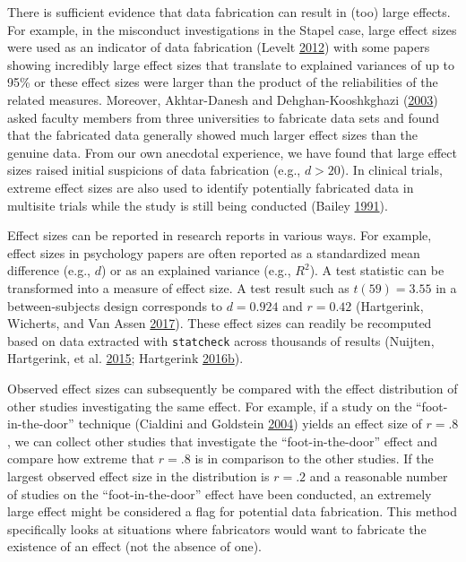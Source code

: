\documentclass[a5paper]{book}
\begin{document}
There is sufficient evidence that data fabrication can result in (too)
large effects. For example, in the misconduct investigations in the
Stapel case, large effect sizes were used as an indicator of data
fabrication (Levelt \protect\hyperlink{ref-Levelt2012}{2012}) with some
papers showing incredibly large effect sizes that translate to explained
variances of up to 95\% or these effect sizes were larger than the
product of the reliabilities of the related measures. Moreover,
Akhtar-Danesh and Dehghan-Kooshkghazi
(\protect\hyperlink{ref-doi:10.1186ux2f1471-2288-3-18}{2003}) asked
faculty members from three universities to fabricate data sets and found
that the fabricated data generally showed much larger effect sizes than
the genuine data. From our own anecdotal experience, we have found that
large effect sizes raised initial suspicions of data fabrication (e.g.,
\(d>20\)). In clinical trials, extreme effect sizes are also used to
identify potentially fabricated data in multisite trials while the study
is still being conducted (Bailey
\protect\hyperlink{ref-doi:10.1016ux2f0197-24569190037-M}{1991}).

Effect sizes can be reported in research reports in various ways. For
example, effect sizes in psychology papers are often reported as a
standardized mean difference (e.g., \(d\)) or as an explained variance
(e.g., \(R^2\)). A test statistic can be transformed into a measure of
effect size. A test result such as \(t( 59)=3.55\) in a between-subjects
design corresponds to \(d=0.924\) and \(r=0.42\) (Hartgerink, Wicherts,
and Van Assen \protect\hyperlink{ref-doi:10.1525ux2fcollabra.71}{2017}).
These effect sizes can readily be recomputed based on data extracted
with \texttt{statcheck} across thousands of results (Nuijten,
Hartgerink, et al.
\protect\hyperlink{ref-doi:10.3758ux2fs13428-015-0664-2}{2015};
Hartgerink
\protect\hyperlink{ref-doi:10.3390ux2fdata1030014}{2016}\protect\hyperlink{ref-doi:10.3390ux2fdata1030014}{b}).

Observed effect sizes can subsequently be compared with the effect
distribution of other studies investigating the same effect. For
example, if a study on the \enquote{foot-in-the-door} technique
(Cialdini and Goldstein
\protect\hyperlink{ref-doi:10.1146ux2fannurev.psych.55.090902.142015}{2004})
yields an effect size of \(r=.8\), we can collect other studies that
investigate the \enquote{foot-in-the-door} effect and compare how
extreme that \(r=.8\) is in comparison to the other studies. If the
largest observed effect size in the distribution is \(r=.2\) and a
reasonable number of studies on the \enquote{foot-in-the-door} effect
have been conducted, an extremely large effect might be considered a
flag for potential data fabrication. This method specifically looks at
situations where fabricators would want to fabricate the existence of an
effect (not the absence of one).
\end{document}
